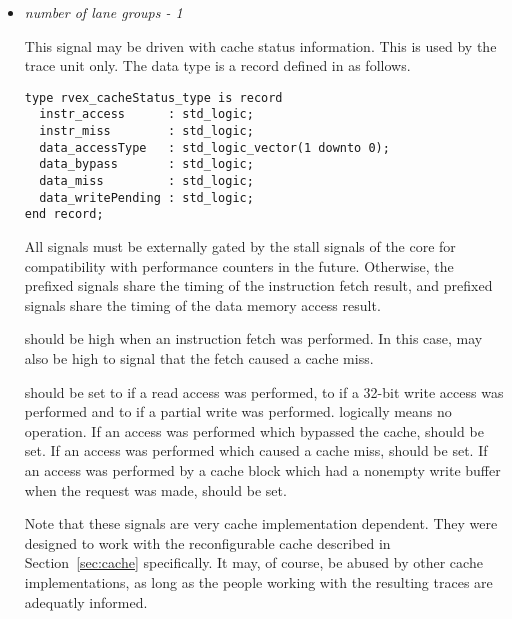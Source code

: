 \begin{itemize}
\vspace{1em}
\item {}\textit{number of lane groups - 1}

This signal may be driven with cache status information. This is used by the 
trace unit only. The data type is a record defined in  as 
follows.

\begin{lstlisting}[numbers=none]
type rvex_cacheStatus_type is record
  instr_access      : std_logic;
  instr_miss        : std_logic;
  data_accessType   : std_logic_vector(1 downto 0);
  data_bypass       : std_logic;
  data_miss         : std_logic;
  data_writePending : std_logic;
end record;
\end{lstlisting}

All signals must be externally gated by the stall signals of the core for 
compatibility with performance counters in the future. Otherwise, the 
 prefixed signals share the timing of the instruction fetch result, 
and  prefixed signals share the timing of the data memory access 
result.

 should be high when an instruction fetch was performed. In
this case,  may also be high to signal that the fetch caused a
cache miss.

 should be set to  if a read access was performed,
to  if a 32-bit write access was performed and to  if a
partial write was performed.  logically means no operation. If an
access was performed which bypassed the cache,  should be set.
If an access was performed which caused a cache miss,  should be
set. If an access was performed by a cache block which had a nonempty write
buffer when the request was made,  should be set.

Note that these signals are very cache implementation dependent. They were
designed to work with the reconfigurable cache described in
Section~\ref{sec:cache} specifically. It may, of course, be abused by other
cache implementations, as long as the people working with the resulting traces
are adequatly informed.

\end{itemize}

